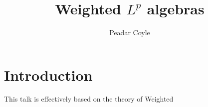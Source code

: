 \documentclass[a4paper,10pt]{article}
\title{Weighted $L^{p}$ algebras}
\author{Peadar Coyle}
\theoremstyle{plain}
\begin{document}
\maketitle
 \tableofcontents   
\begin{abstract}
 
\end{abstract}
\section{Introduction}
This talk is effectively based on the theory of Weighted 



\end{document}
